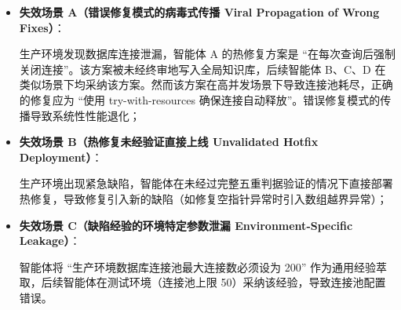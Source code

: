 \begin{itemize}
\item
  \textbf{失效场景 A（错误修复模式的病毒式传播 Viral Propagation of
  Wrong Fixes）}：

  生产环境发现数据库连接泄漏，智能体 A 的热修复方案是
  ``在每次查询后强制关闭连接''。该方案被未经终审地写入全局知识库，后续智能体
  B、C、D
  在类似场景下均采纳该方案。然而该方案在高并发场景下导致连接池耗尽，正确的修复应为
  ``使用 try-with-resources
  确保连接自动释放''。错误修复模式的传播导致系统性性能退化；
\item
  \textbf{失效场景 B（热修复未经验证直接上线 Unvalidated Hotfix
  Deployment）}：

  生产环境出现紧急缺陷，智能体在未经过完整五重判据验证的情况下直接部署热修复，导致修复引入新的缺陷（如修复空指针异常时引入数组越界异常）；
\item
  \textbf{失效场景 C（缺陷经验的环境特定参数泄漏 Environment-Specific
  Leakage）}：

  智能体将 ``生产环境数据库连接池最大连接数必须设为 200''
  作为通用经验萃取，后续智能体在测试环境（连接池上限
  50）采纳该经验，导致连接池配置错误。

\begin{Shaded}
\begin{Highlighting}[]






\end{Highlighting}
\end{Shaded}
\end{itemize}
